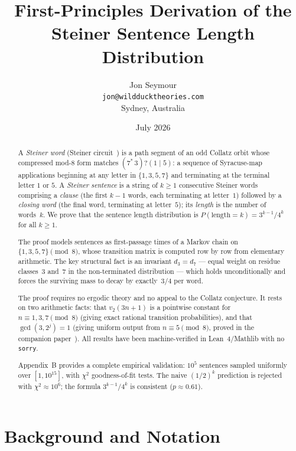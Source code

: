 \documentclass[12pt]{article}
\title{First-Principles Derivation of the Steiner Sentence Length Distribution}
\author{Jon Seymour\\
  \texttt{jon@wildducktheories.com}\\
  Sydney, Australia}
\date{July 2026}
\theoremstyle{definition}
\theoremstyle{remark}
\begin{document}
\maketitle

\begin{abstract}
A \emph{Steiner word} (Steiner circuit~\cite{steiner}) is a path segment
of an odd Collatz orbit whose compressed mod-8 form matches $(7^*\,3)?(1\mid 5)$:
a sequence of Syracuse-map applications beginning at any letter in $\{1,3,5,7\}$
and terminating at the terminal letter $1$ or $5$.
A \emph{Steiner sentence} is a string of $k \geq 1$ consecutive Steiner words
comprising a \emph{clause} (the first $k-1$ words, each terminating
at letter~$1$) followed by a \emph{closing word} (the final word, terminating at
letter~$5$); its \emph{length} is the number of words~$k$.
We prove that the sentence length distribution is
$P(\text{length} = k) = 3^{k-1}/4^k$ for all $k \geq 1$.

The proof models sentences as first-passage times of a Markov chain on
$\{1,3,5,7\} \pmod{8}$, whose transition matrix is computed row by row from
elementary arithmetic.
The key structural fact is an invariant $d_3 = d_7$ — equal weight on
residue classes~3 and~7 in the non-terminated distribution — which holds
unconditionally and forces the surviving mass to decay by exactly~$3/4$
per word.

The proof requires no ergodic theory and no appeal to the Collatz conjecture.
It rests on two arithmetic facts: that $v_2(3n+1)$ is a pointwise constant
for $n \equiv 1, 3, 7 \pmod{8}$ (giving exact rational transition probabilities),
and that $\gcd(3, 2^j) = 1$ (giving uniform output from $n \equiv 5 \pmod{8}$,
proved in the companion paper~\cite{paper66}).
All results have been machine-verified in Lean~4/Mathlib with no \texttt{sorry}.

Appendix~B provides a complete empirical validation: $10^5$ sentences sampled
uniformly over $[1, 10^{15}]$, with $\chi^2$ goodness-of-fit tests.
The naive $(1/2)^k$ prediction is rejected with $\chi^2 \approx 10^6$;
the formula $3^{k-1}/4^k$ is consistent ($p \approx 0.61$).
\end{abstract}

\tableofcontents

\section{Background and Notation}
\label{sec:background}
\end{document}
